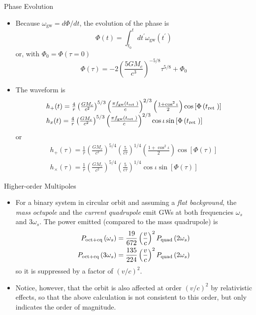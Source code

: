 \documentclass[size=11pt,style=paintings]{powerdot}
\begin{document}
\begin{slide}{Phase Evolution}
 \begin{itemize}
 \item Because $\omega_{\mathrm{gw}} = d\Phi/dt$, the evolution of the phase is 
\vspace{-0.2cm}
 $$
  \Phi(t)  =\int_{t_{0}}^{t} d t^{\prime} \omega_{\mathrm{gw}}\left(t^{\prime}\right)
$$
\vspace{-0.2cm}
or, with $\Phi_0=\Phi(\tau=0)$
$$
\boxed{\Phi(\tau)=-2\left(\frac{5 G M_{c}}{c^{3}}\right)^{-5 / 8} \tau^{5 / 8}+\Phi_{0}}
$$
\item The waveform is 
$$
\vspace{-0.2cm}
\begin{array}{l}{h_{+}(t)=\frac{4}{r}\left(\frac{G M_{c}}{c^{2}}\right)^{5 / 3}\left(\frac{\pi f_{\mathrm{gw}}\left(t_{\text {ret }}\right)}{c}\right)^{2 / 3}\left(\frac{1+\cos ^{2} \iota}{2}\right) \cos \left[\Phi\left(t_{\text {ret }}\right)\right]} \\ {h_{x}(t)=\frac{4}{r}\left(\frac{G M_{c}}{c^{2}}\right)^{5 / 3}\left(\frac{\pi f_{\mathrm{gw}}\left(t_{\text {ret }}\right)}{c}\right)^{2 / 3} \cos \iota \sin \left[\Phi\left(t_{\text {ret }}\right)\right]}\end{array}
$$
or
\vspace{-0.1cm}
$$
\begin{array}{l}{h_{+}(\tau)=\frac{1}{r}\left(\frac{G M_{c}}{c^{2}}\right)^{5 / 4}\left(\frac{5}{c \tau}\right)^{1 / 4}\left(\frac{1+\cos ^{2} \iota}{2}\right) \cos [\Phi(\tau)]} \\ {h_{\times}(\tau)=\frac{1}{r}\left(\frac{G M_{c}}{c^{2}}\right)^{5 / 4}\left(\frac{5}{c \tau}\right)^{1 / 4} \cos \iota \sin [\Phi(\tau)]}\end{array}
$$
 \end{itemize}
 \end{slide}
 
 \begin{slide}{Higher-order Multipoles}
 \begin{itemize}
\item For a binary system in circular orbit and assuming a \textit{flat background}, the \textit{mass octupole }and the \textit{current quadrupole} emit GWs at both frequencies  $\omega_s$ and $3\omega_s$. The power emitted (compared to the mass quadrupole) is
 $$
\begin{aligned} P_{\rm oct+cq}\left(\omega_{s}\right)&=\frac{19}{672}\left(\frac{v}{c}\right)^{2} P_{\rm quad}\left(2 \omega_{s}\right) \\ P_{\rm oct+cq}\left(3 \omega_{s}\right) &=\frac{135}{224}\left(\frac{v}{c}\right)^{2} P_{\rm quad}\left(2 \omega_{s}\right) \end{aligned}
$$
so it is suppressed by a factor of $(v/c)^2$. 
\vspace{0.3cm}
\item Notice, however, that the orbit is also affected at order $(v/c)^2$ by relativistic effects, so that the above calculation is not consistent to this order, but only indicates the order of magnitude.
 \end{itemize}
 \end{slide}
\end{document}

